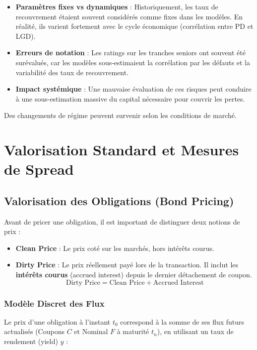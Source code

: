 \begin{itemize}
    \item \textbf{Paramètres fixes vs dynamiques} : Historiquement, les taux de recouvrement étaient souvent considérés comme fixes dans les modèles. En réalité, ils varient fortement avec le cycle économique (corrélation entre PD et LGD).
    \item \textbf{Erreurs de notation} : Les ratings sur les tranches seniors ont souvent été surévalués, car les modèles sous-estimaient la corrélation par les défauts et la variabilité des taux de recouvrement.
    \item \textbf{Impact systémique} : Une mauvaise évaluation de ces risques peut conduire à une sous-estimation massive du capital nécessaire pour couvrir les pertes.
\end{itemize}

Des changements de régime peuvent survenir selon les conditions de marché.

\section{Valorisation Standard et Mesures de Spread}

\subsection{Valorisation des Obligations (Bond Pricing)}

Avant de pricer une obligation, il est important de distinguer deux notions de prix :
\begin{itemize}
    \item \textbf{Clean Price} : Le prix coté sur les marchés, hors intérêts courus.
    \item \textbf{Dirty Price} : Le prix réellement payé lors de la transaction. Il inclut les \textbf{intérêts courus} (accrued interest) depuis le dernier détachement de coupon.
    \begin{equation}
        \text{Dirty Price} = \text{Clean Price} + \text{Accrued Interest}
    \end{equation}
\end{itemize}

\subsubsection{Modèle Discret des Flux}

Le prix d'une obligation à l'instant $t_0$ correspond à la somme de ses flux futurs actualisés (Coupons $C$ et Nominal $F$ à maturité $t_n$), en utilisant un taux de rendement (yield) $y$ :

